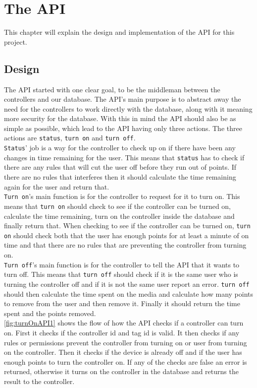 \chapter{The API}
\label{chap:api}
This chapter will explain the design and implementation of the API for this project.
\section{Design}
The API started with one clear goal, to be the middleman between the controllers and our database. The API's main purpose is to abstract away the need for the controllers to work directly with the database, along with it meaning more security for the database. With this in mind the API should also be as simple as possible, which lead to the API having only three actions. The three actions are \texttt{status}, \texttt{turn on} and \texttt{turn off}. \\
\texttt{Status}' job is a way for the controller to check up on if there have been any changes in time remaining for the user. This means that \texttt{status} has to check if there are any rules that will cut the user off before they run out of points. If there are no rules that interferes then it should calculate the time remaining again for the user and return that. \\
\texttt{Turn on}'s main function is for the controller to request for it to turn on. This means that \texttt{turn on} should check to see if the controller can be turned on, calculate the time remaining, turn on the controller inside the database and finally return that. When checking to see if the controller can be turned on, \texttt{turn on} should check both that the user has enough points for at least a minute of on time and that there are no rules that are preventing the controller from turning on.\\
\texttt{Turn off}'s main function is for the controller to tell the API that it wants to turn off. This means that \texttt{turn off} should check if it is the same user who is turning the controller off and if it is not the same user report an error. \texttt{turn off} should then calculate the time spent on the media and calculate how many points to remove from the user and then remove it. Finally it should return the time spent and the points removed. \\
\autoref{fig:turnOnAPI1} shows the flow of how the API checks if a controller can turn on. First it checks if the controller id and tag id is valid. It then checks if any rules or permissions prevent the controller from turning on or user from turning on the controller. Then it checks if the device is already off and if the user has enough points to turn the controller on. If any of the checks are false an error is returned, otherwise it turns on the controller in the database and returns the result to the controller.

